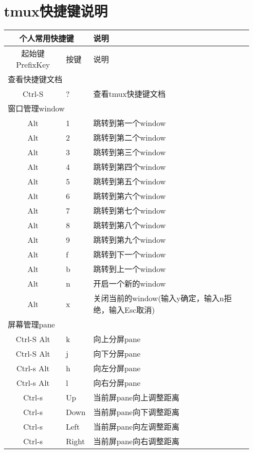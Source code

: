 \documentclass[11pt]{article}
\begin{document}
\section{tmux快捷键说明}
\begin{left}
  \begin{tabular}{|c|l|l|}
    \hline
    \multicolumn{2}{|c|}{\textbf{个人常用快捷键}} & \textbf{说明} \\   
    \hline
    起始键PrefixKey & 按键 & 说明 \\
    \hline \multicolumn{3}{|l|}{查看快捷键文档} \\ \hline
    Ctrl-S & ? & 查看tmux快捷键文档 \\
    \hline \multicolumn{3}{|l|}{窗口管理window} \\ \hline
    Alt & 1 & 跳转到第一个window \\
    Alt & 2 & 跳转到第二个window \\
    Alt & 3 & 跳转到第三个window \\
    Alt & 4 & 跳转到第四个window \\
    Alt & 5 & 跳转到第五个window \\
    Alt & 6 & 跳转到第六个window \\
    Alt & 7 & 跳转到第七个window \\
    Alt & 8 & 跳转到第八个window \\
    Alt & 9 & 跳转到第九个window \\
    Alt & f & 跳转到下一个window \\
    Alt & b & 跳转到上一个window \\
    Alt & n & 开启一个新的window \\
    Alt & x & 关闭当前的window(输入y确定，输入n拒绝，输入Esc取消) \\
    \hline \multicolumn{3}{|l|}{屏幕管理pane} \\ \hline
    Ctrl-S Alt & k & 向上分屏pane \\
    Ctrl-S Alt & j & 向下分屏pane \\
    Ctrl-s Alt & h & 向左分屏pane \\
    Ctrl-s Alt & l & 向右分屏pane \\    
    Ctrl-s & Up & 当前屏pane向上调整距离 \\
    Ctrl-s & Down & 当前屏pane向下调整距离 \\
    Ctrl-s & Left  & 当前屏pane向左调整距离 \\
    Ctrl-s & Right  & 当前屏pane向右调整距离 \\
    \hline
  \end{tabular}  
\end{left}
\end{document}
